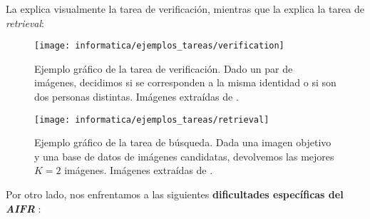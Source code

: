 

La  explica visualmente la tarea de verificación, mientras que la  explica la tarea de \textit{retrieval}:

\begin{figure}[H]
	\centering
	\texttt{[image: informatica/ejemplos\_tareas/verification]}
	\caption{Ejemplo gráfico de la tarea de verificación. Dado un par de imágenes, decidimos si se corresponden a la misma identidad o si son dos personas distintas. Imágenes extraídas de \cite{informatica:cacd_dataset}.}
	\label{img:ejemplo_verificacion}
\end{figure}

\begin{figure}[H]
	\centering
	\texttt{[image: informatica/ejemplos\_tareas/retrieval]}
	\caption{Ejemplo gráfico de la tarea de búsqueda. Dada una imagen objetivo y una base de datos de imágenes candidatas, devolvemos las mejores $K = 2$ imágenes. Imágenes extraídas de \cite{informatica:cacd_dataset}.}
	\label{img:ejemplo_retrieval}
\end{figure}

Por otro lado, nos enfrentamos a las siguientes \textbf{dificultades específicas del \textit{AIFR}} \cite{informatica:challenges_retrieval}:

